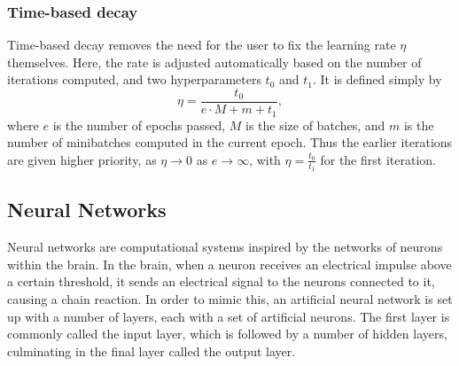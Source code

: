 \documentclass{article}
\theoremstyle{definition}
\begin{document}
\subsubsection{Time-based decay}
Time-based decay removes the need for the user to fix the learning rate $\eta$ themselves. Here, the rate is adjusted automatically based on the number of iterations computed, and two hyperparameters $t_0$ and $t_1$. It is defined simply by
\begin{equation}\label{eq:TimeDecay}
    \eta = \frac{t_0}{e \cdot M + m + t_1},
\end{equation}
where $e$ is the number of epochs passed, $M$ is the size of batches, and $m$ is the number of minibatches computed in the current epoch. Thus the earlier iterations are given higher priority, as $\eta \to 0$ as $e \to \infty$, with $\eta = \frac{t_0}{t_1}$ for the first iteration.

\subsection{Neural Networks}

Neural networks are computational systems inspired by the networks of neurons within the brain. In the brain, when a neuron receives an electrical impulse above a certain threshold, it sends an electrical signal to the neurons connected to it, causing a chain reaction. In order to mimic this, an artificial neural network is set up with a number of layers, each with a set of artificial neurons. The first layer is commonly called the input layer, which is followed by a number of hidden layers, culminating in the final layer called the output layer.
\end{document}
